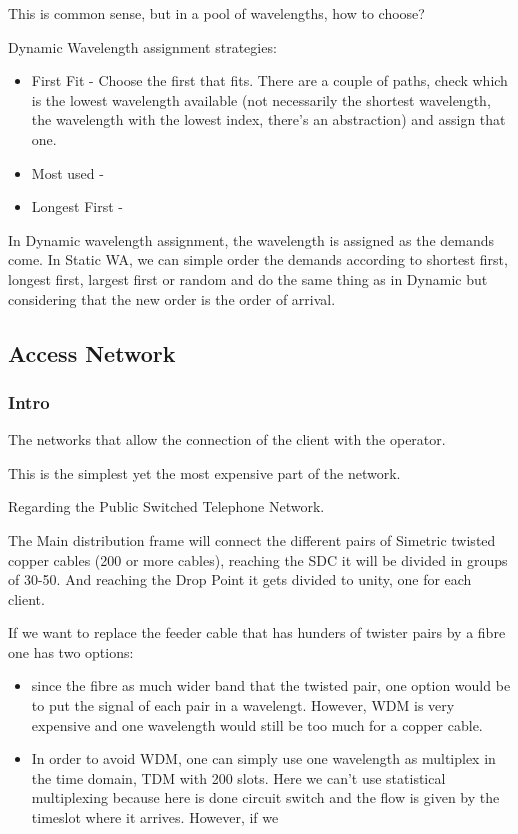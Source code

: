 This is common sense, but in a pool of wavelengths, how to choose?

Dynamic Wavelength assignment strategies:
\begin{itemize}
    \item First Fit - Choose the first that fits. There are a couple of paths, check which is the lowest wavelength available (not necessarily the shortest wavelength, the wavelength with the lowest index, there's an abstraction) and assign that one.
    \item Most used - 
    \item Longest First - 
\end{itemize}

In Dynamic wavelength assignment, the wavelength is assigned as the demands come. 
In Static WA, we can simple order the demands according to shortest first, longest first, largest first or random and do the same thing as in Dynamic but considering that the new order is the order of arrival.




\subsection{Access Network}
\subsubsection{Intro}
The networks that allow the connection of the client with the operator.

This is the simplest yet the most expensive part of the network.

Regarding the Public Switched Telephone Network.



The Main distribution frame will connect the different pairs of Simetric twisted copper cables (200 or more cables), reaching the SDC it will be divided in groups of 30-50. And reaching the Drop Point it gets divided to unity, one for each client.

If we want to replace the feeder cable that has hunders of twister pairs by a fibre one has two options:
\begin{itemize}
    \item since the fibre as much wider band that the twisted pair, one option would be to put the signal of each pair in a wavelengt. However, WDM is very expensive and one wavelength would still be too much for a copper cable. 
    \item In order to avoid WDM, one can simply use one wavelength as multiplex in the time domain, TDM with 200 slots. Here we can't use statistical multiplexing because here is done circuit switch and the flow is given by the timeslot where it arrives. However, if we 
\end{itemize}

